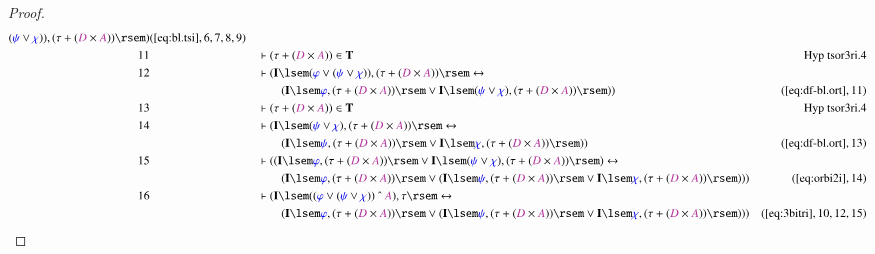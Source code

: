 \begin{proof}
\begin{align}
      ( \mw{\psi} \vee \mw{\chi} ) ) , ( \tau + ( \mc{D}
      \times \mc{A} ) ) \rsem
      )&(\mbox{\ref{eq:bl.tsi}},6,7,8,9)\notag
  \\ 11 &&  & \vdash ( \tau + ( \mc{D} \times \mc{A} ) ) \in
      \mathbf{T}&\text{Hyp~tsor3ri.4}\notag%
  \\ 12 &&  & \vdash ( \mathbf{I} \lsem ( \mw{\varphi} \vee ( \mw{\psi} \vee
      \mw{\chi} ) ) , ( \tau + ( \mc{D} \times \mc{A} ) )
      \rsem \leftrightarrow  \notag \\ & & & \qquad
     ( \mathbf{I} \lsem \mw{\varphi}
      , ( \tau + ( \mc{D} \times \mc{A} ) ) \rsem \vee
      \mathbf{I} \lsem ( \mw{\psi} \vee \mw{\chi} ) , (
      \tau + ( \mc{D} \times \mc{A} ) ) \rsem )
      )&(\mbox{\ref{eq:df-bl.ort}},11)\notag
  \\ 13 &&  & \vdash ( \tau + ( \mc{D} \times \mc{A} ) ) \in
      \mathbf{T}&\text{Hyp~tsor3ri.4}\notag%
  \\ 14 &&  & \vdash ( \mathbf{I} \lsem ( \mw{\psi} \vee \mw{\chi} ) , ( \tau +
      ( \mc{D} \times \mc{A} ) ) \rsem \leftrightarrow  \notag \\ & & & \qquad
     (
      \mathbf{I} \lsem \mw{\psi} , ( \tau + ( \mc{D} \times
      \mc{A} ) ) \rsem \vee \mathbf{I} \lsem \mw{\chi} , (
      \tau + ( \mc{D} \times \mc{A} ) ) \rsem )
      )&(\mbox{\ref{eq:df-bl.ort}},13)\notag
  \\ 15 &&  & \vdash ( ( \mathbf{I} \lsem \mw{\varphi} , ( \tau + ( \mc{D}
      \times \mc{A} ) ) \rsem \vee \mathbf{I} \lsem (
      \mw{\psi} \vee \mw{\chi} ) , ( \tau + ( \mc{D} \times
      \mc{A} ) ) \rsem ) \leftrightarrow  \notag \\ & & & \qquad
     ( \mathbf{I} \lsem
      \mw{\varphi} , ( \tau + ( \mc{D} \times \mc{A} ) )
      \rsem \vee ( \mathbf{I} \lsem \mw{\psi} , ( \tau + (
      \mc{D} \times \mc{A} ) ) \rsem \vee \mathbf{I} \lsem
      \mw{\chi} , ( \tau + ( \mc{D} \times \mc{A} ) ) \rsem
      ) ) )&(\mbox{\ref{eq:orbi2i}},14)\notag
  \\ 16 &&  & \vdash ( \mathbf{I} \lsem ( ( \mw{\varphi} \vee ( \mw{\psi} \vee
      \mw{\chi} ) ) ~\string^~ \mc{A} ) , \tau \rsem
      \leftrightarrow  \notag \\ & & & \qquad
     ( \mathbf{I} \lsem \mw{\varphi} , (
      \tau + ( \mc{D} \times \mc{A} ) ) \rsem \vee (
      \mathbf{I} \lsem \mw{\psi} , ( \tau + ( \mc{D} \times
      \mc{A} ) ) \rsem \vee \mathbf{I} \lsem \mw{\chi} , (
      \tau + ( \mc{D} \times \mc{A} ) ) \rsem ) )
      )&(\mbox{\ref{eq:3bitri}},10,12,15)\notag

\end{align}
\end{proof}
